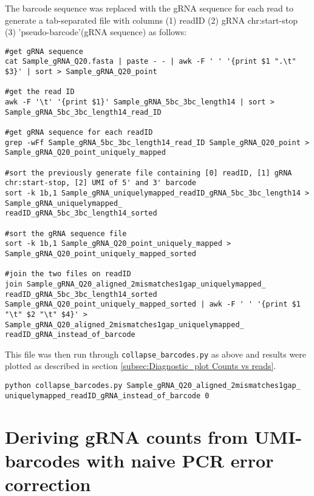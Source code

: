 The barcode sequence was replaced with the gRNA sequence for each read to generate a tab-separated file with columns (1) readID (2) gRNA chr:start-stop (3) 'pseudo-barcode'(gRNA sequence) as follows:

\begin{small}\begin{lstlisting}
#get gRNA sequence 
cat Sample_gRNA_Q20.fasta | paste - - | awk -F ' ' '{print $1 ".\t" $3}' | sort > Sample_gRNA_Q20_point

#get the read ID
awk -F '\t' '{print $1}' Sample_gRNA_5bc_3bc_length14 | sort > Sample_gRNA_5bc_3bc_length14_read_ID

#get gRNA sequence for each readID
grep -wFf Sample_gRNA_5bc_3bc_length14_read_ID Sample_gRNA_Q20_point > Sample_gRNA_Q20_point_uniquely_mapped

#sort the previously generate file containing [0] readID, [1] gRNA chr:start-stop, [2] UMI of 5' and 3' barcode
sort -k 1b,1 Sample_gRNA_uniquelymapped_readID_gRNA_5bc_3bc_length14 > Sample_gRNA_uniquelymapped_
readID_gRNA_5bc_3bc_length14_sorted

#sort the gRNA sequence file
sort -k 1b,1 Sample_gRNA_Q20_point_uniquely_mapped > Sample_gRNA_Q20_point_uniquely_mapped_sorted

#join the two files on readID
join Sample_gRNA_Q20_aligned_2mismatches1gap_uniquelymapped_
readID_gRNA_5bc_3bc_length14_sorted Sample_gRNA_Q20_point_uniquely_mapped_sorted | awk -F ' ' '{print $1 "\t" $2 "\t" $4}' > Sample_gRNA_Q20_aligned_2mismatches1gap_uniquelymapped_
readID_gRNA_instead_of_barcode
\end{lstlisting}\end{small}

This file was then run through \verb|collapse_barcodes.py| as above and results were plotted as described in section \ref{subsec:Diagnostic_plot Counts vs reads}.

\begin{small}\begin{lstlisting}
python collapse_barcodes.py Sample_gRNA_Q20_aligned_2mismatches1gap_
uniquelymapped_readID_gRNA_instead_of_barcode 0
\end{lstlisting}\end{small}

\section{Deriving gRNA counts from UMI-barcodes with naive PCR error correction}

